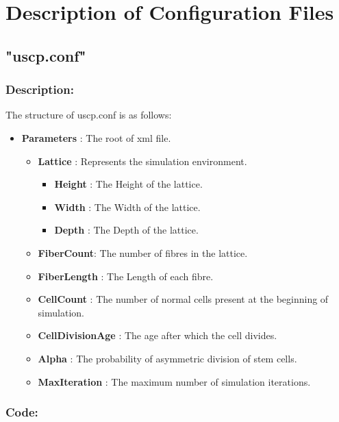 \documentclass[11pt]{report}
\begin{document}
  \section{\color{red}Description of Configuration Files}
  \subsection{\color{blue}"uscp.conf"}
  \subsubsection{\color{green}Description: }
  The structure of uscp.conf is as follows:
  \begin{itemize}
   \item \textbf{Parameters} : The root of xml file.
   \begin{itemize}
    \item \textbf{Lattice} : Represents the simulation environment.
    \begin{itemize}
     \item \textbf{Height} : The Height of the lattice.
     \item \textbf{Width} : The Width of the lattice.
     \item \textbf{Depth} : The Depth of the lattice.
    \end{itemize}

    \item \textbf{FiberCount}: The number of fibres in the lattice.
    \item \textbf{FiberLength} : The Length of each fibre.
    \item \textbf{CellCount} : The number of normal cells present at the beginning of simulation.
    \item \textbf{CellDivisionAge} : The age after which the cell divides.
    \item \textbf{Alpha} : The probability of asymmetric division of stem cells.
    \item \textbf{MaxIteration} : The maximum number of simulation iterations.

   \end{itemize}

  \end{itemize}
  
  \subsubsection{\color{green}Code: }
  \lstset{language=XML}
  
\end{document}
